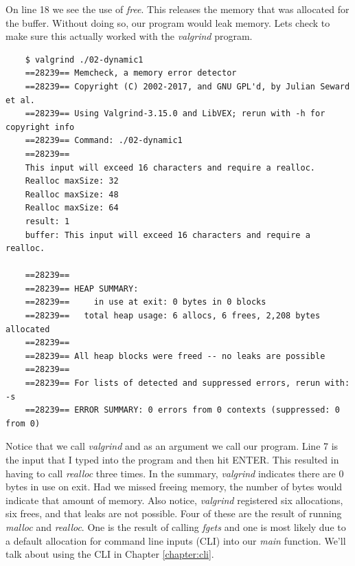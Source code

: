 \documentclass[../main.tex]{subfiles}
\begin{document}
	On line 18 we see the use of \textit{free}.  This releases the memory that was allocated for the buffer.  Without doing so, our program would leak memory.  Lets check to make sure this actually worked with the \textit{valgrind} program.
	
	\begin{verbatim}
	$ valgrind ./02-dynamic1
	==28239== Memcheck, a memory error detector
	==28239== Copyright (C) 2002-2017, and GNU GPL'd, by Julian Seward et al.
	==28239== Using Valgrind-3.15.0 and LibVEX; rerun with -h for copyright info
	==28239== Command: ./02-dynamic1
	==28239== 
	This input will exceed 16 characters and require a realloc.
	Realloc maxSize: 32
	Realloc maxSize: 48
	Realloc maxSize: 64
	result: 1
	buffer: This input will exceed 16 characters and require a realloc.
	
	==28239== 
	==28239== HEAP SUMMARY:
	==28239==     in use at exit: 0 bytes in 0 blocks
	==28239==   total heap usage: 6 allocs, 6 frees, 2,208 bytes allocated
	==28239== 
	==28239== All heap blocks were freed -- no leaks are possible
	==28239== 
	==28239== For lists of detected and suppressed errors, rerun with: -s
	==28239== ERROR SUMMARY: 0 errors from 0 contexts (suppressed: 0 from 0)
	\end{verbatim}
	
	Notice that we call \textit{valgrind} and as an argument we call our program.  Line 7 is the input that I typed into the program and then hit ENTER.  This resulted in having to call \textit{realloc} three times.  In the summary, \textit{valgrind} indicates there are 0 bytes in use on exit.  Had we missed freeing memory, the number of bytes would indicate that amount of memory.  Also notice, \textit{valgrind} registered six allocations, six frees, and that leaks are not possible.  Four of these are the result of running \textit{malloc} and \textit{realloc}.  One is the result of calling \textit{fgets} and one is most likely due to a default allocation for command line inputs (CLI) into our \textit{main} function.  We'll talk about using the CLI in Chapter \ref{chapter:cli}.
	
\end{document}
